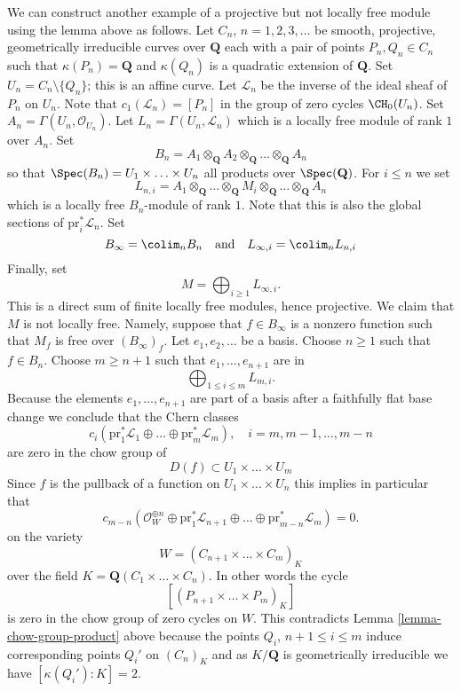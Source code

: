 \noindent
We can construct another example of a projective but not locally free
module using the lemma above as follows. Let
$C_n$, $n = 1, 2, 3, \ldots$ be smooth, projective, geometrically irreducible
curves over $\mathbf{Q}$ each with a pair of points
$P_n, Q_n \in C_n$ such that $\kappa(P_n) = \mathbf{Q}$ and
$\kappa(Q_n)$ is a quadratic extension of $\mathbf{Q}$.
Set $U_n = C_n \setminus \{Q_n\}$; this is an affine curve.
Let $\mathcal{L}_n$ be the inverse of the ideal sheaf of $P_n$
on $U_n$. Note that $c_1(\mathcal{L}_n) = [P_n]$ in the group of
zero cycles $\CH_0(U_n)$. Set $A_n = \Gamma(U_n, \mathcal{O}_{U_n})$.
Let $L_n = \Gamma(U_n, \mathcal{L}_n)$ which is a locally
free module of rank $1$ over $A_n$. Set
$$
B_n = A_1 \otimes_{\mathbf{Q}} A_2 \otimes_{\mathbf{Q}} \ldots
\otimes_{\mathbf{Q}} A_n
$$
so that $\Spec(B_n) = U_1 \times \ldots \times U_n$ all products
over $\Spec(\mathbf{Q})$. For $i \leq n$ we set
$$
L_{n, i} =
A_1 \otimes_{\mathbf{Q}} \ldots \otimes_{\mathbf{Q}} M_i
\otimes_{\mathbf{Q}} \ldots \otimes_{\mathbf{Q}} A_n
$$
which is a locally free $B_n$-module of rank $1$. Note that this is
also the global sections of $\text{pr}_i^*\mathcal{L}_n$. Set
$$
B_\infty = \colim_n B_n
\quad\text{and}\quad
L_{\infty, i} = \colim_n L_{n, i}
$$
Finally, set
$$
M = \bigoplus\nolimits_{i \geq 1} L_{\infty, i}.
$$
This is a direct sum of finite locally free modules, hence projective.
We claim that $M$ is not locally free. Namely, suppose that
$f \in B_\infty$ is a nonzero function such that $M_f$ is free
over $(B_\infty)_f$. Let $e_1, e_2, \ldots$ be a basis. Choose
$n \geq 1$ such that $f \in B_n$.
Choose $m \geq n + 1$ such that $e_1, \ldots, e_{n + 1}$ are in
$$
\bigoplus\nolimits_{1 \leq i \leq m} L_{m, i}.
$$
Because the elements $e_1, \ldots, e_{n + 1}$ are part of a basis
after a faithfully flat base change we conclude that
the Chern classes
$$
c_i(\text{pr}_1^*\mathcal{L}_1 \oplus \ldots \oplus
\text{pr}_m^*\mathcal{L}_m), \quad i = m, m - 1, \ldots, m - n
$$
are zero in the chow group of
$$
D(f) \subset U_1 \times \ldots \times U_m
$$
Since $f$ is the pullback of a function on $U_1 \times \ldots \times U_n$
this implies in particular that
$$
c_{m - n}(\mathcal{O}_W^{\oplus n} \oplus
\text{pr}_1^*\mathcal{L}_{n + 1} \oplus \ldots
\oplus \text{pr}_{m - n}^*\mathcal{L}_m) = 0.
$$
on the variety
$$
W = (C_{n + 1} \times \ldots \times C_m)_K
$$
over the field $K = \mathbf{Q}(C_1 \times \ldots \times C_n)$.
In other words the cycle
$$
[(P_{n + 1} \times \ldots \times P_m)_K]
$$
is zero in the chow group of zero cycles on $W$. This contradicts
Lemma \ref{lemma-chow-group-product}
above because the points $Q_i$, $n + 1 \leq i \leq m$
induce corresponding points $Q_i'$ on $(C_n)_K$ and as $K/\mathbf{Q}$
is geometrically irreducible we have $[\kappa(Q_i') : K] = 2$.


